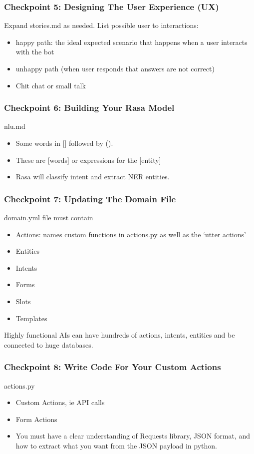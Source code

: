 \begin{frame}\frametitle{Checkpoint 5: Designing The User Experience (UX)}
Expand stories.md as needed. List possible user to interactions:
 \begin{itemize}
\item  happy path: the ideal expected scenario that happens when a user interacts with the bot
\item unhappy path (when user responds that answers are not correct)
\item Chit chat or small talk
\end{itemize}
\end{frame}

\begin{frame}\frametitle{Checkpoint 6: Building Your Rasa Model}
nlu.md
 \begin{itemize}
\item Some words in [] followed by (). 
\item These are [words] or expressions for the [entity] 
\item Rasa will classify intent and extract NER entities.
\end{itemize}

\end{frame}

\begin{frame}\frametitle{Checkpoint 7: Updating The Domain File}
domain.yml file must contain
 \begin{itemize}
\item Actions: names custom functions in actions.py as well as the ‘utter actions’
\item Entities
\item Intents
\item Forms
\item Slots
\item Templates
\end{itemize}
Highly functional AIs can have hundreds of actions, intents, entities and be connected to huge databases.
\end{frame}


\begin{frame}\frametitle{Checkpoint 8: Write Code For Your Custom Actions}
actions.py
 \begin{itemize}
\item Custom Actions, ie API calls
\item Form Actions
\item You must have a clear understanding of Requests library, JSON format, and how to extract what you want from the JSON payload in python.
\end{itemize}

\end{frame}

